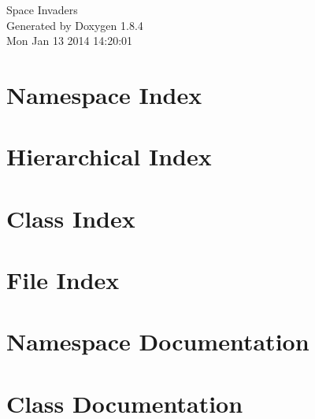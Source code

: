 \documentclass[twoside]{book}
\newcommand{\clearemptydoublepage}{%
  \newpage{\pagestyle{empty}\cleardoublepage}%
}
\begin{document}
\begin{titlepage}
\vspace*{7cm}
\begin{center}%
{\Large Space Invaders }\\
\vspace*{1cm}
{\large Generated by Doxygen 1.8.4}\\
\vspace*{0.5cm}
{\small Mon Jan 13 2014 14:20:01}\\
\end{center}
\end{titlepage}
\clearemptydoublepage
\tableofcontents
\clearemptydoublepage
{}

\chapter{Namespace Index}

\chapter{Hierarchical Index}

\chapter{Class Index}

\chapter{File Index}

\chapter{Namespace Documentation}


\chapter{Class Documentation}





























\end{document}
